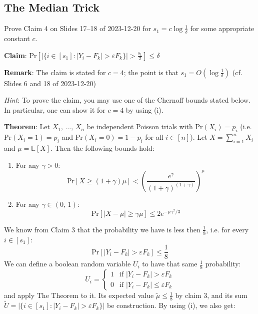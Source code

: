 \documentclass{article}
\let\epsilon\varepsilon
\begin{document}
  \subsection{The Median Trick}
  \begin{centerframebox}
    Prove Claim 4 on Slides 17--18 of 2023-12-20 for $s_1 = c \log\frac{1}{\delta}$ for some appropriate
    constant $c$.

    \textbf{Claim}: $\mathrm{Pr}\left[|\{i\in[s_1]:|Y_i-F_k| >\epsilon F_k\}| > \frac{s_1}{2}\right] \le \delta$

    \textbf{Remark}:
    The claim is stated for $c = 4$; the point is that $s_1 = O(\log\frac{1}{\delta})$ (cf. Slides 6 and 18 of 2023-12-20)

    \textit{Hint}: To prove the claim, you may use one of the Chernoff bounds stated below.
    In particular, one can show it for $c = 4$ by using (i).

    \textbf{Theorem}:
    Let $X_1,\, \dots,\, X_n$ be independent Poisson trials with
    $\mathrm{Pr}(X_i) = p_i$ (i.e. $\mathrm{Pr}(X_i = 1) = p_i$ and $\mathrm{Pr}(X_i = 0) = 1 - p_i$ for all $i \in [n]$).
    Let $X = \sum_{i=1}^n X_i$ and $\mu = \mathbb{E}[X]$.
    Then the following bounds hold:
    \begin{enumerate}[label=(\roman*)]
      \item For any $\gamma > 0$:
      \[ \mathrm{Pr}[X \geq (1+\gamma)\mu]  < \left(\frac{e^\gamma}{(1+\gamma)^{(1+\gamma)}}\right)^\mu\]

      \item For any $\gamma \in (0,\, 1)$:
      \[ \mathrm{Pr}[|X - \mu|\geq \gamma\mu] \leq 2e^{-\mu\gamma^2/3} \]
    \end{enumerate}
  \end{centerframebox}
  We know from Claim 3 that the probability we have is less then $\frac{1}{8}$,
  i.e. for every $i \in [s_1]$:
  \[ \mathrm{Pr}[|Y_i-F_k| > \epsilon F_k] \leq \frac{1}{8} \]
  We can define a boolean random variable $U_i$ to have that same $\frac{1}{8}$ probability:
  \[ U_i = \begin{cases}
    1 & \textrm{if } |Y_i-F_k| > \epsilon F_k \\
    0 & \textrm{if } |Y_i-F_k| \leq \epsilon F_k
  \end{cases} \]
  and apply The Theorem to it.
  Its expected value $\tilde{\mu} \leq \frac{1}{8}$ by claim 3,
  and its sum $\tilde{U} = |\{i\in[s_1]:|Y_i-F_k| >\epsilon F_k\}|$ be construction.
  By using (i), we also get:
\end{document}
